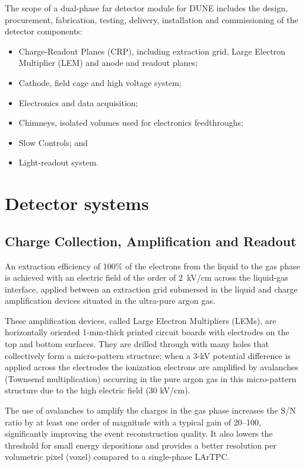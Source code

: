 The scope of a dual-phase far detector module for DUNE includes the design,
procurement, fabrication, testing, delivery, installation and
commissioning of the detector components:
\begin{itemize}
\item Charge-Readout Planes (CRP), including extraction grid, Large Electron Multiplier (LEM) and anode and readout planes;
\item Cathode, field cage and high voltage system;  
\item Electronics and data acquisition; 
\item Chimneys, isolated volumes used for electronics feedthroughs;  
\item Slow Controls; and
\item Light-readout system.
\end{itemize}

\section{Detector systems}
\label{sec:fddp-ov-systems}
\subsection{Charge Collection, Amplification and Readout}

An extraction efficiency of 100\% of the electrons from the liquid to
the gas phase is achieved with an electric field of the order of
2~kV/cm across the liquid-gas interface, applied between an 
extraction grid submersed in the liquid and charge amplification 
devices situated in the ultra-pure argon gas. 

These amplification devices, called Large Electron Multipliers (LEMs), are horizontally 
oriented 1-mm-thick printed 
circuit boards with electrodes on the top and bottom surfaces. They are drilled
through with many holes that collectively form a micro-pattern structure;  
when a 3-kV potential difference is applied across the electrodes
the ionization electrons are amplified by avalanches (Townsend multiplication) occurring in the 
pure argon gas in this micro-pattern structure due to the high electric field (30 kV/cm).

The use of avalanches to amplify the charges in the gas phase increases
the S/N ratio by at least one order of magnitude with a typical gain of 20--100, significantly
improving the event reconstruction quality. It also lowers the
threshold for small energy depositions and provides a better
resolution per volumetric pixel (voxel) compared to a single-phase
LArTPC. 

